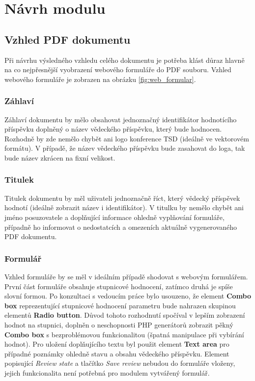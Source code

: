 \chapter{Návrh modulu}

\section{Vzhled PDF dokumentu}
\label{sec:navrh_vzhledu}
Při návrhu výsledného vzhledu celého dokumentu je potřeba klást důraz hlavně na co nejpřesnější vyobrazení webového formuláře do PDF souboru. Vzhled webového formuláře je zobrazen na obrázku \ref{fig:web_formular}.

\subsection{Záhlaví}
Záhlaví dokumentu by mělo obsahovat jednoznačný identifikátor hodnotícího příspěvku doplněný o název vědeckého příspěvku, který bude hodnocen. Rozhodně by zde nemělo chybět ani logo konference TSD (ideálně ve vektorovém formátu). V případě, že název vědeckého příspěvku bude zasahovat do loga, tak bude název zkrácen na fixní velikost.

\subsection{Titulek}
Titulek dokumentu by měl uživateli jednoznačně říct, který vědecký příspěvek hodnotí (ideálně zobrazit název i identifikátor). V titulku by nemělo chybět ani jméno posuzovatele a doplňující informace ohledně vyplňování formuláře, případně ho informovat o nedostatcích a omezeních aktuálně vygenerovaného PDF dokumentu.

\subsection{Formulář}
Vzhled formuláře by se měl v ideálním případě shodovat s webovým formulářem. První část formuláře obsahuje stupnicové hodnocení, zatímco druhá je spíše slovní formou. Po konzultaci s vedoucím práce bylo usouzeno, že element \textbf{Combo box} reprezentující stupnicové hodnocení parametru bude nahrazen skupinou elementů \textbf{Radio button}. Důvod tohoto rozhodnutí spočíval v lepším zobrazení hodnot na stupnici, doplněn o neschopnosti PHP generátorů zobrazit pěkný \textbf{Combo box} s bezproblémovou funkcionalitou (špatná manipulace při vybírání hodnot). Pro uložení doplňujícího textu byl použit element \textbf{Text area} pro případné poznámky ohledně stavu a obsahu vědeckého příspěvku. Element popisující \textit{Review state} a tlačítko \textit{Save review} nebudou do formuláře vloženy, jejich funkcionalita není potřebná pro modulem vytvářený formulář.

